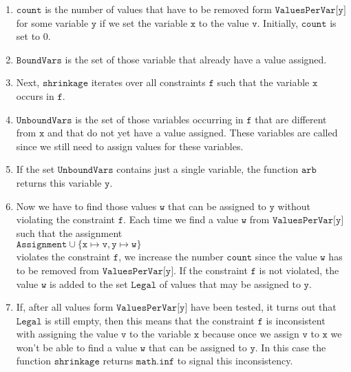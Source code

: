 \begin{enumerate}
\item $\texttt{count}$ is the number of values that have to be removed form $\texttt{ValuesPerVar[y]}$ 
      for some variable $\texttt{y}$ if we set the variable $\texttt{x}$ to the value $\texttt{v}$.  
      Initially, $\texttt{count}$ is set to $0$.
\item $\texttt{BoundVars}$ is the set of those variable that already have a value assigned.
\item Next, $\texttt{shrinkage}$ iterates over all  constraints $\texttt{f}$ such that the variable
      $\texttt{x}$ occurs in $\texttt{f}$.
\item $\texttt{UnboundVars}$ is the set of those variables occurring in $\texttt{f}$ that are different from
      $\texttt{x}$ and that do not yet have a value assigned.  These variables are called  
      since we still need to assign values for these variables.
\item If the set $\texttt{UnboundVars}$ contains just a single variable,
      the function $\texttt{arb}$ returns this variable $\texttt{y}$.
\item Now we have to find those values $\texttt{w}$ that can be assigned to $\texttt{y}$ without violating the
      constraint $\texttt{f}$.  Each time we find a value $\texttt{w}$ from $\texttt{ValuesPerVar[y]}$ such that
      the assignment
      \\[0.2cm]
      \hspace*{1.3cm}
      $\texttt{Assignment} \cup \{ \texttt{x} \mapsto \texttt{v}, \texttt{y} \mapsto \texttt{w} \}$
      \\[0.2cm]
      violates the constraint $\texttt{f}$, we increase the number $\texttt{count}$ since the value $\texttt{w}$
      has to be removed from $\texttt{ValuesPerVar[y]}$.  If the constraint $\texttt{f}$ is not violated,
      the value $\texttt{w}$ is added to the set $\texttt{Legal}$ of values that may be assigned to $\texttt{y}$.
\item If, after all values form $\texttt{ValuesPerVar[y]}$ have been tested, it turns out that
      $\texttt{Legal}$ is still empty, then this means that the constraint $\texttt{f}$ is inconsistent with
      assigning the value $\texttt{v}$ to the variable $\texttt{x}$ because 
      once we assign $\texttt{v}$ to $\texttt{x}$ we won't be able to find a value $\texttt{w}$ that can be
      assigned to $\texttt{y}$.  
      In this case the function $\texttt{shrinkage}$ returns $\texttt{math.inf}$ to signal this inconsistency.
\end{enumerate}


